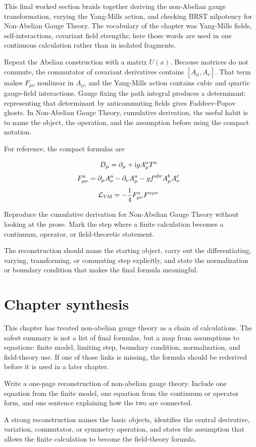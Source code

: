 This final worked section braids together deriving the non-Abelian gauge transformation, varying the Yang-Mills action, and checking BRST nilpotency for Non-Abelian Gauge Theory.  The vocabulary of the chapter was Yang-Mills fields, self-interactions, covariant field strengths; here those words are used in one continuous calculation rather than in isolated fragments.

Repeat the Abelian construction with a matrix \(U(x)\).  Because matrices do not commute, the commutator of covariant derivatives contains \([A_\mu,A_\nu]\).  That term makes \(F_{\mu\nu}\) nonlinear in \(A_\mu\), and the Yang-Mills action contains cubic and quartic gauge-field interactions.  Gauge fixing the path integral produces a determinant; representing that determinant by anticommuting fields gives Faddeev-Popov ghosts.  In Non-Abelian Gauge Theory, cumulative derivation, the useful habit is to name the object, the operation, and the assumption before using the compact notation.

For reference, the compact formulas are

\[
  D_\mu=\partial_\mu+\mathrm i gA_\mu^aT^a
\]
\[
  F_{\mu\nu}^a=\partial_\mu A_\nu^a-\partial_\nu A_\mu^a-gf^{abc}A_\mu^bA_\nu^c
\]
\[
  \mathcal L_{\mathrm{YM}}=-\frac14F_{\mu\nu}^aF^{a\mu\nu}
\]

\begin{exercise}
Reproduce the cumulative derivation for Non-Abelian Gauge Theory without looking at the prose.  Mark the step where a finite calculation becomes a continuum, operator, or field-theoretic statement.
\begin{answer}
The reconstruction should name the starting object, carry out the differentiating, varying, transforming, or commuting step explicitly, and state the normalization or boundary condition that makes the final formula meaningful.
\end{answer}
\end{exercise}



\section{Chapter synthesis}

This chapter has treated non-abelian gauge theory as a chain of calculations.  The safest summary is not a list of final formulas, but a map from assumptions to equations: finite model, limiting step, boundary condition, normalization, and field-theory use.  If one of those links is missing, the formula should be rederived before it is used in a later chapter.

\begin{exercise}
Write a one-page reconstruction of non-abelian gauge theory.  Include one equation from the finite model, one equation from the continuum or operator form, and one sentence explaining how the two are connected.
\begin{answer}
A strong reconstruction names the basic objects, identifies the central derivative, variation, commutator, or symmetry operation, and states the assumption that allows the finite calculation to become the field-theory formula.
\end{answer}
\end{exercise}
